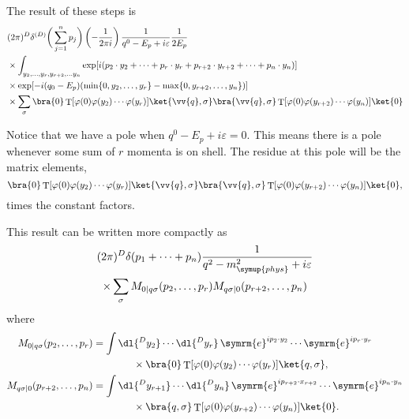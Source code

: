 \documentclass[fleqn]{NotesClass}
\newcommand{\e}{\symrm{e}}
\DeclareMathOperator{\timeOrdering}{T}
\newcommand{\phys}{\symup{phys}}
\begin{document}
    The result of these steps is
    \begin{align}
        &(2\pi)^D \delta^{(D)}\bigg( \sum_{j=1}^{n} p_j \bigg) \left( -\frac{1}{2\pi i} \right) \frac{1}{q^0 - E_p + i\varepsilon} \frac{1}{2E_p}\\
        &\times \int_{y_2, \dotsc, y_r, y_{r+2}, \dotsc y_n} \exp[i(p_2 \cdot y_2 + \dotsb + p_r \cdot y_r + p_{r+2} \cdot y_{r+2} + \dotsb + p_n \cdot y_n)] \notag\\
        &\times \exp[-i(q_0 - E_p)(\min\{0, y_2, \dotsc, y_r\} - \max\{0, y_{r+2}, \dotsc, y_{n}\})]\notag\\
        &\times \sum_\sigma \bra{0} \timeOrdering[\varphi(0) \varphi(y_2) \dotsm \varphi(y_r)] \ket{\vv{q}, \sigma} \bra{\vv{q}, \sigma} \timeOrdering[\varphi(0) \varphi(y_{r+2}) \dotsm \varphi(y_n)] \ket{0} \notag
    \end{align}
    
    Notice that we have a pole when \(q^0 - E_p + i\varepsilon = 0\).
    This means there is a pole whenever some sum of \(r\) momenta is on shell.
    The residue at this pole will be the matrix elements,
    \begin{equation}
        \bra{0} \timeOrdering[\varphi(0) \varphi(y_2) \dotsm \varphi(y_r)] \ket{\vv{q}, \sigma} \bra{\vv{q}, \sigma} \timeOrdering[\varphi(0) \varphi(y_{r+2}) \dotsm \varphi(y_n)] \ket{0},
    \end{equation}
    times the constant factors.
    
    This result can be written more compactly as
    \begin{multline}
        (2\pi)^D \delta(p_1 + \dotsb + p_n) \frac{1}{q^2 - m_{\phys}^2 + i\varepsilon}\\
        \times \sum_{\sigma} M_{0|q\sigma}(p_2, \dotsc, p_r) M_{q\sigma|0}(p_{r+2}, \dotsc, p_n)
    \end{multline}
    where
    \begin{align}
        M_{0|q\sigma}(p_2, \dotsc, p_r) &= \int \dl{^Dy_2} \dotsm \dl{^Dy_r} \, \e^{ip_2 \cdot y_2} \dotsm \e^{ip_r \cdot y_r}\notag\\
        &\qquad\qquad\times \bra{0} \timeOrdering[\varphi(0) \varphi(y_2) \dotsm \varphi(y_r)] \ket{q, \sigma},\\
        M_{q\sigma|0}(p_{r + 2}, \dotsc, p_n) &= \int \dl{^Dy_{r+1}} \dotsm \dl{^Dy_n} \, \e^{ip_{r+2} \cdot x_{r+2}} \dotsm \e^{ip_n \cdot y_n} \notag\\
        &\qquad\qquad\times \bra{q, \sigma} \timeOrdering[\varphi(0) \varphi(y_{r+2}) \dotsm \varphi(y_n)] \ket{0}.
    \end{align}
    
\end{document}
